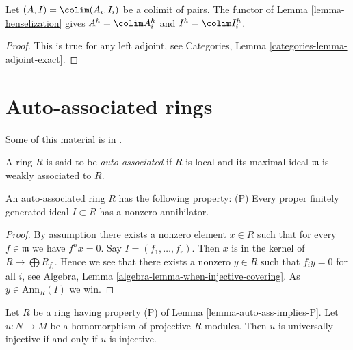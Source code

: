 \begin{lemma}
\label{lemma-henselization-colimit}
Let $(A, I) = \colim (A_i, I_i)$ be a colimit of pairs. The functor of
Lemma \ref{lemma-henselization} gives
$A^h = \colim A_i^h$ and $I^h = \colim I_i^h$.
\end{lemma}

\begin{proof}
This is true for any left adjoint, see
Categories, Lemma \ref{categories-lemma-adjoint-exact}.
\end{proof}






\section{Auto-associated rings}
\label{section-auto-ass}

\noindent
Some of this material is in \cite{Autour}.

\begin{definition}
\label{definition-auto-ass}
A ring $R$ is said to be {\it auto-associated} if $R$ is local and its
maximal ideal $\mathfrak m$ is weakly associated to $R$.
\end{definition}

\begin{lemma}
\label{lemma-auto-ass-implies-P}
An auto-associated ring $R$ has the following property: (P)
Every proper finitely generated ideal $I \subset R$ has a nonzero
annihilator.
\end{lemma}

\begin{proof}
By assumption there exists a nonzero element $x \in R$ such that for every
$f \in \mathfrak m$ we have $f^n x = 0$. Say $I = (f_1, \ldots, f_r)$.
Then $x$ is in the kernel of $R \to \bigoplus R_{f_i}$. Hence we see
that there exists a nonzero $y \in R$ such that $f_i y = 0$ for all $i$, see
Algebra, Lemma \ref{algebra-lemma-when-injective-covering}.
As $y \in \text{Ann}_R(I)$ we win.
\end{proof}

\begin{lemma}
\label{lemma-P-universally-injective}
Let $R$ be a ring having property (P) of
Lemma \ref{lemma-auto-ass-implies-P}.
Let $u : N \to M$ be a homomorphism of projective $R$-modules.
Then $u$ is universally injective if and only if $u$ is injective.
\end{lemma}

